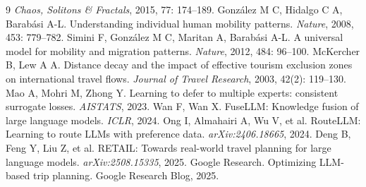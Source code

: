 \documentclass[UTF8,zihao=-4,a4paper]{ctexart}
\begin{document}
\begin{thebibliography}{9}
\emph{Chaos, Solitons \& Fractals}, 2015, 77: 174--189.
 Gonz\'alez M C, Hidalgo C A, Barab\'asi A-L.
Understanding individual human mobility patterns.
\emph{Nature}, 2008, 453: 779--782.
 Simini F, Gonz\'alez M C, Maritan A, Barab\'asi A-L.
A universal model for mobility and migration patterns.
\emph{Nature}, 2012, 484: 96--100.
 McKercher B, Lew A A.
Distance decay and the impact of effective tourism exclusion zones on international travel flows.
\emph{Journal of Travel Research}, 2003, 42(2): 119--130.
 Mao A, Mohri M, Zhong Y.
Learning to defer to multiple experts: consistent surrogate losses.
\emph{AISTATS}, 2023.
 Wan F, Wan X.
FuseLLM: Knowledge fusion of large language models.
\emph{ICLR}, 2024.
 Ong I, Almahairi A, Wu V, et al.
RouteLLM: Learning to route LLMs with preference data.
\emph{arXiv:2406.18665}, 2024.
 Deng B, Feng Y, Liu Z, et al.
RETAIL: Towards real-world travel planning for large language models.
\emph{arXiv:2508.15335}, 2025.
 Google Research.
Optimizing LLM-based trip planning.
Google Research Blog, 2025.
\end{thebibliography}
\end{document}
